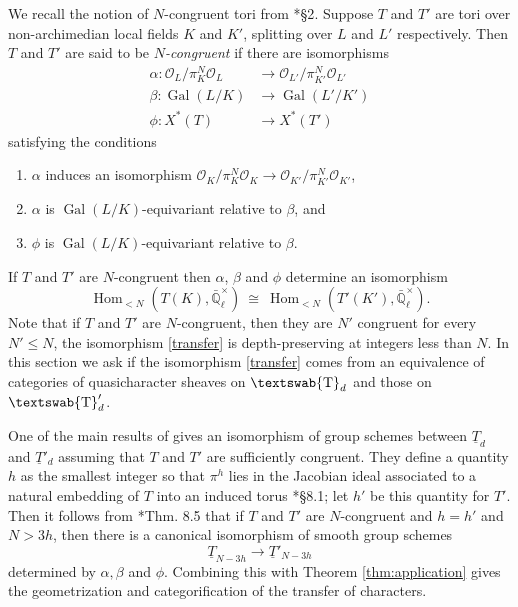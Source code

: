 \documentclass[11pt]{amsart}
\newcommand{\mathswab}[1]{\operatorname{\textswab{#1}}}
\theoremstyle{plain}
\theoremstyle{definition}
\theoremstyle{remark}
\newcommand{\EE}{\mathbb{\bar Q}_\ell}
\newcommand{\OK}{\mathcal{O}_K}
\newcommand{\OL}{\mathcal{O}_L}
\newcommand{\OO}[1]{\mathcal{O}_{#1}}
\newcommand{\EEx}{\EE^\times}
\DeclareMathOperator{\Gal}{Gal}
\DeclareMathOperator{\Hom}{Hom}
\newcommand{\iso}{{\ \cong\ }}
\newcommand{\GN}[1]{\mathswab{#1}}
\newcommand{\TT}{\underline{T}}
\newcommand\Clifton[1]{\marginpar{\smaller\smaller CC: #1}}
\begin{document}
We recall the notion of $N$-congruent tori from  \cite{chai-yu:01a}*{\S 2}.
Suppose $T$ and $T'$ are tori over non-archimedian local fields $K$ and $K'$,
splitting over $L$ and $L'$ respectively.
Then $T$ and $T'$ are said to be \emph{$N$-congruent} if there are isomorphisms
 \begin{align*}
  \alpha : \OL/\pi_K^N \OL &\to \OO{L'}/\pi_{K'}^N \OO{L'} \\
  \beta : \Gal(L/K) &\to \Gal(L'/K') \\
  \phi : X^*(T) &\to X^*(T')
 \end{align*}
 satisfying the conditions
 \begin{enumerate}
  \item $\alpha$ induces an isomorphism $\OK/\pi_K^N \OK \to \OO{K'}/\pi_{K'}^N \OO{K'}$,
  \item $\alpha$ is $\Gal(L/K)$-equivariant relative to $\beta$, and
  \item $\phi$ is $\Gal(L/K)$-equivariant relative to $\beta$.
 \end{enumerate}
If $T$ and $T'$ are $N$-congruent then $\alpha$, $\beta$ and $\phi$ determine an isomorphism
\begin{equation}\label{transfer}
  \Hom_{<N}(T(K), \EEx) \iso \Hom_{<N}(T'(K'),\EEx).
\end{equation}
Note that if $T$ and $T'$ are $N$-congruent, then they are $N'$ congruent for every $N' \leq N$, the isomorphism \eqref{transfer} is depth-preserving at integers less than $N$.
In this section we ask if the isomorphism \eqref{transfer} comes from an equivalence of categories of quasicharacter sheaves on $\GN{T}_d$ and those on $\GN{T}'_d$.

One of the main results of \cite{chai-yu:01a} gives an isomorphism of group schemes between
$\TT_d$ and $\TT'_d$ assuming that $T$ and $T'$ are sufficiently congruent.
They define a quantity $h$ as the smallest integer so that $\pi^h$ lies in the
Jacobian ideal associated to a natural embedding of $T$ into an induced torus \cite{chai-yu:01a}*{\S 8.1}; let $h'$ be this quantity for $T'$.
Then it follows from \cite{chai-yu:01a}*{Thm. 8.5} that if $T$ and $T'$ are $N$-congruent and $h=h'$ and $N > 3h$, 
\Clifton{Is this correct?}
then there is a canonical isomorphism of smooth group schemes
 \[
  \TT_{N-3h} \to \TT'_{N-3h}
 \]
 determined by $\alpha, \beta$ and $\phi$.
Combining this with Theorem \ref{thm:application} gives the geometrization and categorification of the transfer of characters.
\end{document}
